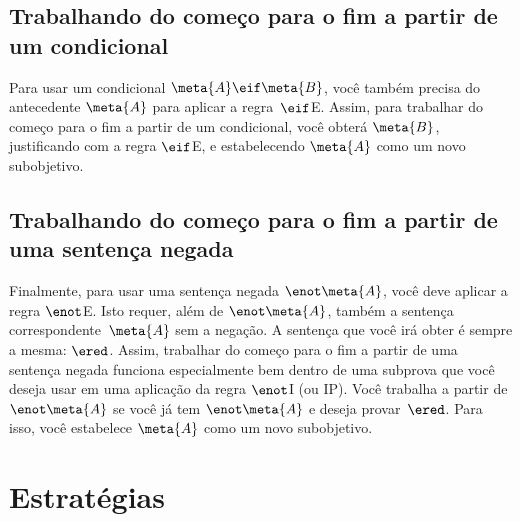 \subsection*{ Trabalhando do começo para o fim a partir de um condicional}

Para usar um condicional $\meta{A} \eif \meta{B}$, você também precisa do antecedente $\meta{A}$ para aplicar a regra~$\eif$E. Assim, para trabalhar do começo para o fim a partir de um condicional, você obterá $\meta{B}$, justificando com a regra $\eif$E, e estabelecendo $\meta{A}$  como um  novo subobjetivo.
 

\begin{fitchproof}
	\ellipsesline 
\end{fitchproof}

\subsection*{ Trabalhando do começo para o fim a partir de uma sentença negada}

Finalmente, para usar uma sentença negada $\enot \meta{A}$, você deve aplicar a regra $\enot$E. Isto requer, além de  $\enot \meta{A}$,  também a sentença correspondente~$\meta{A}$ sem a negação. A sentença que você irá obter é sempre a mesma: $\ered$. Assim, trabalhar do começo para o fim a partir de uma sentença negada funciona especialmente bem dentro de uma subprova que você deseja usar em uma aplicação da regra $\enot$I (ou IP).  Você trabalha a partir de $\enot \meta{A}$ se você já tem $\enot \meta{A}$ e deseja provar~$\ered$. Para isso, você estabelece $\meta{A}$ como um novo subobjetivo.
\begin{fitchproof}
	\ellipsesline 
\end{fitchproof}


\section{Estratégias }

